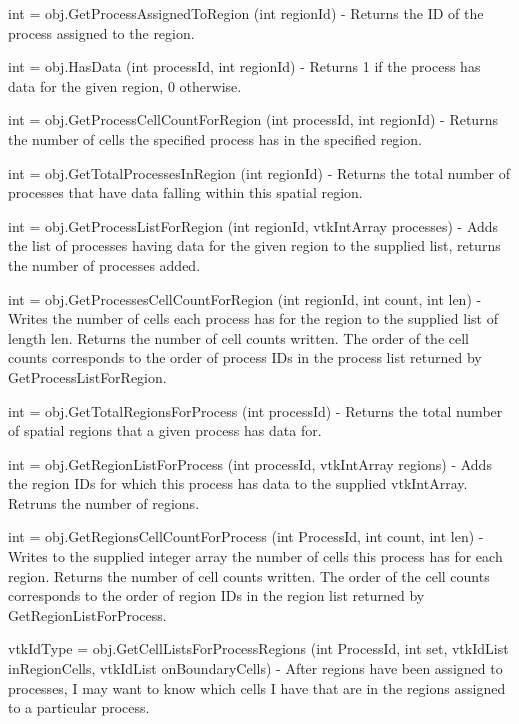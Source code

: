 \begin{DoxyItemize}
\item {\ttfamily int = obj.\-Get\-Process\-Assigned\-To\-Region (int region\-Id)} -\/ Returns the I\-D of the process assigned to the region.  
\item {\ttfamily int = obj.\-Has\-Data (int process\-Id, int region\-Id)} -\/ Returns 1 if the process has data for the given region, 0 otherwise.  
\item {\ttfamily int = obj.\-Get\-Process\-Cell\-Count\-For\-Region (int process\-Id, int region\-Id)} -\/ Returns the number of cells the specified process has in the specified region.  
\item {\ttfamily int = obj.\-Get\-Total\-Processes\-In\-Region (int region\-Id)} -\/ Returns the total number of processes that have data falling within this spatial region.  
\item {\ttfamily int = obj.\-Get\-Process\-List\-For\-Region (int region\-Id, vtk\-Int\-Array processes)} -\/ Adds the list of processes having data for the given region to the supplied list, returns the number of processes added.  
\item {\ttfamily int = obj.\-Get\-Processes\-Cell\-Count\-For\-Region (int region\-Id, int count, int len)} -\/ Writes the number of cells each process has for the region to the supplied list of length len. Returns the number of cell counts written. The order of the cell counts corresponds to the order of process I\-Ds in the process list returned by Get\-Process\-List\-For\-Region.  
\item {\ttfamily int = obj.\-Get\-Total\-Regions\-For\-Process (int process\-Id)} -\/ Returns the total number of spatial regions that a given process has data for.  
\item {\ttfamily int = obj.\-Get\-Region\-List\-For\-Process (int process\-Id, vtk\-Int\-Array regions)} -\/ Adds the region I\-Ds for which this process has data to the supplied vtk\-Int\-Array. Retruns the number of regions.  
\item {\ttfamily int = obj.\-Get\-Regions\-Cell\-Count\-For\-Process (int Process\-Id, int count, int len)} -\/ Writes to the supplied integer array the number of cells this process has for each region. Returns the number of cell counts written. The order of the cell counts corresponds to the order of region I\-Ds in the region list returned by Get\-Region\-List\-For\-Process.  
\item {\ttfamily vtk\-Id\-Type = obj.\-Get\-Cell\-Lists\-For\-Process\-Regions (int Process\-Id, int set, vtk\-Id\-List in\-Region\-Cells, vtk\-Id\-List on\-Boundary\-Cells)} -\/ After regions have been assigned to processes, I may want to know which cells I have that are in the regions assigned to a particular process.


\end{DoxyItemize}
